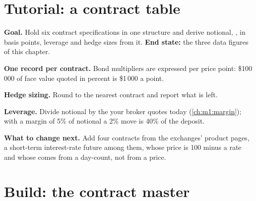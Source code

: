 \section{Tutorial: a contract table}\label{tut:m1:futures-contracts-and-exchanges:table}

\begin{tutorial}
\textbf{Goal.} Hold six contract specifications in one structure and derive
notional, ,  in basis points, leverage and hedge sizes from
it. \textbf{End state:} the three data figures of this chapter.
\begin{tutsteps}
\item \textbf{One record per contract.} Bond multipliers are expressed per
price point: \$100\,000 of face value quoted in percent is \$1\,000 a point.
\label{lst:m1:futures-contracts-and-exchanges:spec}
\item \textbf{Hedge sizing.} Round to the nearest contract and report what
is left.
\label{lst:m1:futures-contracts-and-exchanges:hedge}
\item \textbf{Leverage.} Divide notional by the  your broker
quotes today (\cref{ch:m1:margin}); with a margin of 5\% of notional a 2\% move
is 40\% of the deposit.
\end{tutsteps}
\textbf{What to change next.} Add four contracts from the exchanges'
product pages, a short-term interest-rate future among them, whose price is
100 minus a rate and whose  comes from a day-count, not from a
price.
\end{tutorial}

\section{Build: the contract master}\label{bld:m1:futures-contracts-and-exchanges:master}

